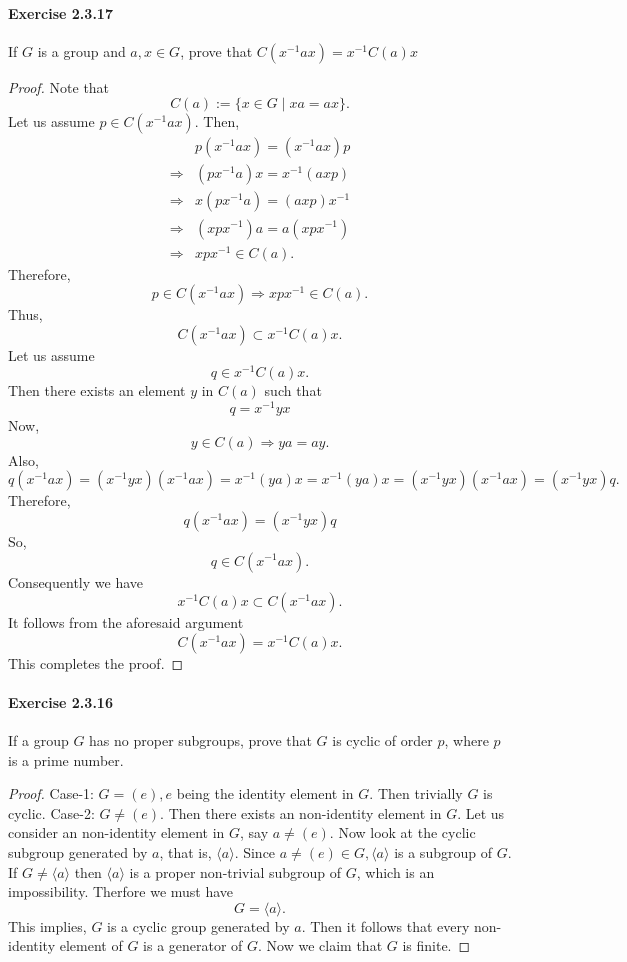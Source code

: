 \documentclass{article}
\begin{document}
\paragraph{Exercise 2.3.17} If $G$ is a group and $a, x \in G$, prove that $C\left(x^{-1} a x\right)=x^{-1} C(a) x$
\begin{proof}
    Note that
$$
C(a):=\{x \in G \mid x a=a x\} .
$$
Let us assume $p \in C\left(x^{-1} a x\right)$. Then,
$$
\begin{aligned}
& p\left(x^{-1} a x\right)=\left(x^{-1} a x\right) p \\
\Longrightarrow & \left(p x^{-1} a\right) x=x^{-1}(a x p) \\
\Longrightarrow & x\left(p x^{-1} a\right)=(a x p) x^{-1} \\
\Longrightarrow & \left(x p x^{-1}\right) a=a\left(x p x^{-1}\right) \\
\Longrightarrow & x p x^{-1} \in C(a) .
\end{aligned}
$$
Therefore,
$$
p \in C\left(x^{-1} a x\right) \Longrightarrow x p x^{-1} \in C(a) .
$$
Thus,
$$
C\left(x^{-1} a x\right) \subset x^{-1} C(a) x .
$$
Let us assume
$$
q \in x^{-1} C(a) x .
$$
Then there exists an element $y$ in $C(a)$ such that
$$
q=x^{-1} y x
$$
Now,
$$
y \in C(a) \Longrightarrow y a=a y .
$$
Also,
$$
q\left(x^{-1} a x\right)=\left(x^{-1} y x\right)\left(x^{-1} a x\right)=x^{-1}(y a) x=x^{-1}(y a) x=\left(x^{-1} y x\right)\left(x^{-1} a x\right)=\left(x^{-1} y x\right) q .
$$
Therefore,
$$
q\left(x^{-1} a x\right)=\left(x^{-1} y x\right) q
$$
So,
$$
q \in C\left(x^{-1} a x\right) .
$$
Consequently we have
$$
x^{-1} C(a) x \subset C\left(x^{-1} a x\right) .
$$
It follows from the aforesaid argument
$$
C\left(x^{-1} a x\right)=x^{-1} C(a) x .
$$
This completes the proof.
\end{proof}


\paragraph{Exercise 2.3.16} If a group $G$ has no proper subgroups, prove that $G$ is cyclic of order $p$, where $p$ is a prime number.
\begin{proof}
    Case-1: $G=(e), e$ being the identity element in $G$. Then trivially $G$ is cyclic.
    Case-2: $G \neq(e)$. Then there exists an non-identity element in $G.$ Let us consider an non-identity element in $G$, say $a\neq (e)$. Now look at the cyclic subgroup generated by $a$, that is, $\langle a\rangle$. Since
    $a\neq (e) \in G,\langle a\rangle$ is a subgroup of $G$.
If $G \neq\langle a\rangle$ then $\langle a\rangle$ is a proper non-trivial subgroup of $G$, which is an impossibility. Therfore we must have
$$
G=\langle a\rangle .
$$
This implies, $G$ is a cyclic group generated by $a$. Then it follows that every non-identity element of $G$ is a generator of $G$. Now we claim that $G$ is finite.
\end{proof}
\end{document}
